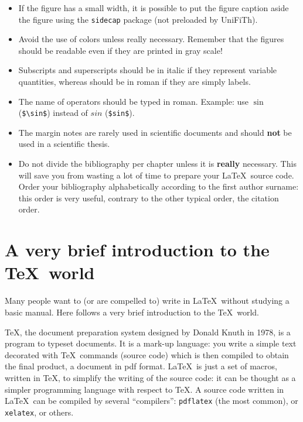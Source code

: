 \documentclass[a5paper,11pt]{article}
\newcommand{\bs}{\textbackslash}
\begin{document}
\begin{itemize}
\item If the figure has a small width, it is possible to put the figure caption
aside the figure using the \texttt{sidecap} package (not preloaded by \textsf{UniFiTh}).

\item Avoid the use of colors unless really necessary. Remember that the figures should be readable even if they are printed in gray scale!

\item Subscripts and superscripts should be in italic if they represent variable quantities, whereas should be in roman if they are simply labels.

\item The name of operators should be typed in roman. Example: use $\sin$ (\texttt{\$\bs sin\$}) instead of $sin$ (\texttt{\$sin\$}).

\item The margin notes are rarely used in scientific documents and should \textbf{not} be used in a scientific thesis.

\item Do not divide the bibliography per chapter unless it is \textbf{really} necessary.
This will save you from wasting a lot of time to prepare your \LaTeX\ source code.
Order your bibliography alphabetically according to the
first author surname: this order is very useful, contrary to the other typical order, the citation order.

\end{itemize}

\clearpage
\appendix

\section{A very brief introduction to the \TeX\ world}

Many people want to (or are compelled to) write in \LaTeX\ without studying
a basic manual. Here follows a very brief introduction to the \TeX\ world.

\TeX, the document preparation system designed by Donald Knuth in 1978, is a program to typeset documents.
It is a mark-up language: you write a simple text decorated with \TeX\ commands (source code) which is then compiled to obtain the final product, a document in pdf format. 
\LaTeX\ is just a set of macros, written in \TeX, to simplify the writing of the source code: it can be thought as a simpler programming language with respect to \TeX. A source code written in \LaTeX\ can be compiled by several ``compilers'': \texttt{pdflatex} (the most common), or \texttt{xelatex}, or others.
\end{document}
